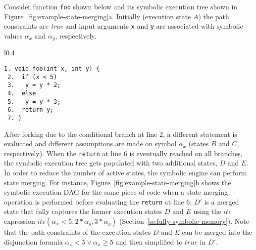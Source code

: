 \begin{shaded} Consider function {\tt foo} shown below and its symbolic execution tree shown in Figure~\ref{fig:example-state-merging}a. Initially (execution state $A$) the path constraints are {\em true} and input arguments {\tt x} and {\tt y} are associated with symbolic values $\alpha_x$ and $\alpha_y$, respectively.
\begin{wrapfigure}{l}{0.4\textwidth}
  \vspace{-4.2mm}
  \begin{lstlisting}[basicstyle=\ttfamily\small]
 1. void foo(int x, int y) {
 2.  if (x < 5)
 3.   y = y * 2;
 4.  else
 5.   y = y * 3;
 6.  return y;
 7. }
\end{lstlisting}
\vspace{-5.8mm}
\end{wrapfigure}
After forking due to the conditional branch at line 2, a different statement is evaluated and different assumptions are made on symbol $\alpha_x$ (states $B$ and $C$, respectively). When the {\tt return} at line 6 is eventually reached on all branches, the symbolic execution tree gets populated with two additional states, $D$ and $E$. In order to reduce the number of active states, the symbolic engine can perform state merging. For instance, Figure~\ref{fig:example-state-merging}b shows the symbolic execution DAG for the same piece of code when a state merging operation is performed before evaluating the {\tt return} at line 6: $D'$ is a merged state that fully captures the former execution states $D$ and $E$ using the $ite$ expression $ite(\alpha_x<5, 2*\alpha_y, 3*\alpha_y)$ (Section~\ref{ss:fully-symbolic-memory}). 
Note that the path constraints of the execution states $D$ and $E$ can be merged into the disjunction formula $\alpha_x < 5 \vee \alpha_x \geq 5$ and then simplified to $true$ in $D'$.
\end{shaded}

